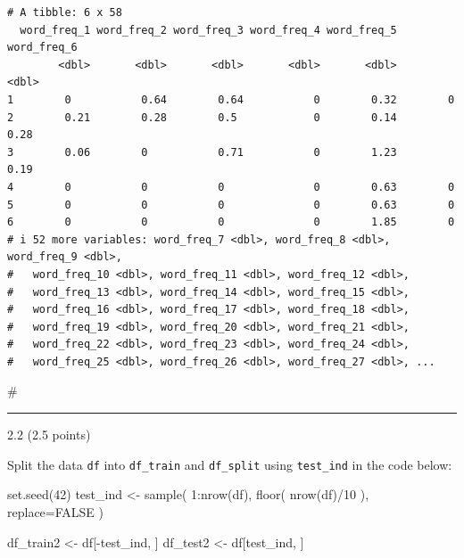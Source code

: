 \documentclass[
  letterpaper,
  DIV=11,
  numbers=noendperiod]{scrartcl}
\newenvironment{Shaded}{\begin{snugshade}}{\end{snugshade}}
\newcommand{\AttributeTok}[1]{\textcolor[rgb]{0.40,0.45,0.13}{#1}}
\newcommand{\CommentTok}[1]{\textcolor[rgb]{0.37,0.37,0.37}{#1}}
\newcommand{\ConstantTok}[1]{\textcolor[rgb]{0.56,0.35,0.01}{#1}}
\newcommand{\DecValTok}[1]{\textcolor[rgb]{0.68,0.00,0.00}{#1}}
\newcommand{\FunctionTok}[1]{\textcolor[rgb]{0.28,0.35,0.67}{#1}}
\newcommand{\NormalTok}[1]{\textcolor[rgb]{0.00,0.23,0.31}{#1}}
\newcommand{\OtherTok}[1]{\textcolor[rgb]{0.00,0.23,0.31}{#1}}
\newcommand{\SpecialCharTok}[1]{\textcolor[rgb]{0.37,0.37,0.37}{#1}}
\begin{document}
\begin{verbatim}
# A tibble: 6 x 58
  word_freq_1 word_freq_2 word_freq_3 word_freq_4 word_freq_5 word_freq_6
        <dbl>       <dbl>       <dbl>       <dbl>       <dbl>       <dbl>
1        0           0.64        0.64           0        0.32        0   
2        0.21        0.28        0.5            0        0.14        0.28
3        0.06        0           0.71           0        1.23        0.19
4        0           0           0              0        0.63        0   
5        0           0           0              0        0.63        0   
6        0           0           0              0        1.85        0   
# i 52 more variables: word_freq_7 <dbl>, word_freq_8 <dbl>, word_freq_9 <dbl>,
#   word_freq_10 <dbl>, word_freq_11 <dbl>, word_freq_12 <dbl>,
#   word_freq_13 <dbl>, word_freq_14 <dbl>, word_freq_15 <dbl>,
#   word_freq_16 <dbl>, word_freq_17 <dbl>, word_freq_18 <dbl>,
#   word_freq_19 <dbl>, word_freq_20 <dbl>, word_freq_21 <dbl>,
#   word_freq_22 <dbl>, word_freq_23 <dbl>, word_freq_24 <dbl>,
#   word_freq_25 <dbl>, word_freq_26 <dbl>, word_freq_27 <dbl>, ...
\end{verbatim}

\begin{Shaded}
\begin{Highlighting}[]
\CommentTok{\#}
\end{Highlighting}
\end{Shaded}

\begin{center}\rule{0.5\linewidth}{0.5pt}\end{center}

2.2 (2.5 points)

Split the data \texttt{df} into \texttt{df\_train} and
\texttt{df\_split} using \texttt{test\_ind} in the code below:

\begin{Shaded}
\begin{Highlighting}[]
\FunctionTok{set.seed}\NormalTok{(}\DecValTok{42}\NormalTok{)}
\NormalTok{test\_ind }\OtherTok{\textless{}{-}} \FunctionTok{sample}\NormalTok{(}
  \DecValTok{1}\SpecialCharTok{:}\FunctionTok{nrow}\NormalTok{(df), }
  \FunctionTok{floor}\NormalTok{( }\FunctionTok{nrow}\NormalTok{(df)}\SpecialCharTok{/}\DecValTok{10}\NormalTok{ ),}
  \AttributeTok{replace=}\ConstantTok{FALSE}
\NormalTok{)}

\NormalTok{df\_train2 }\OtherTok{\textless{}{-}}\NormalTok{ df[}\SpecialCharTok{{-}}\NormalTok{test\_ind, ]}
\NormalTok{df\_test2 }\OtherTok{\textless{}{-}}\NormalTok{ df[test\_ind, ]}
\end{Highlighting}
\end{Shaded}
\end{document}

